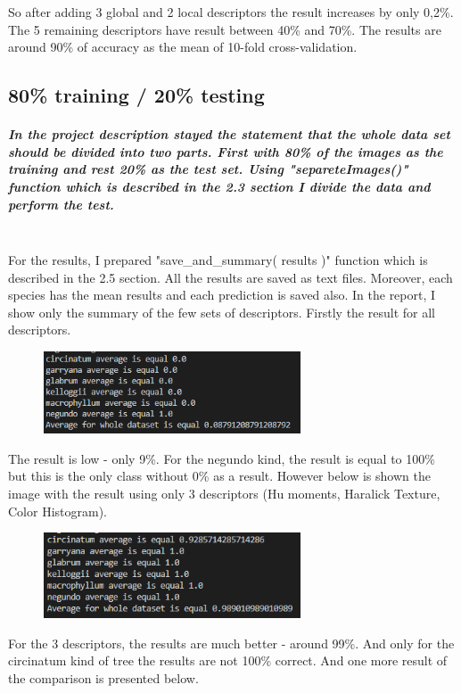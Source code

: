 \documentclass[12pt]{article}
\begin{document}
So after adding 3 global and 2 local descriptors the result increases by only 0,2\%. The 5 remaining descriptors have result between 40\% and 70\%. The results are around 90\% of accuracy as the mean of 10-fold cross-validation.

\subsection{80\% training / 20\% testing}

\subparagraph{
In the project description stayed the statement that the whole data set should be divided into two parts. First with 80\% of the images as the training and rest 20\% as the test set. Using "separeteImages()" function which is described in the 2.3 section I divide the data and perform the test.\\\\
}

For the results, I prepared "save\_and\_summary( results )" function which is described in the 2.5 section. All the results are saved as text files. Moreover, each species has the mean results and each prediction is saved also. In the report, I show only the summary of the few sets of descriptors. Firstly the result for all descriptors.

\begin{figure}[h!]
\centering
\includegraphics[width=3in]{results_1.png}
\end{figure}

The result is low - only 9\%. For the negundo kind, the result is equal to 100\% but this is the only class without 0\% as a result. However below is shown the image with the result using only 3 descriptors (Hu moments, Haralick Texture, Color Histogram).

\begin{figure}[h!]
\centering
\includegraphics[width=3in]{results_3.png}
\end{figure}
For the 3 descriptors, the results are much better - around 99\%. And only for the circinatum kind of tree the results are not 100\% correct. And one more result of the comparison is presented below.
\end{document}
